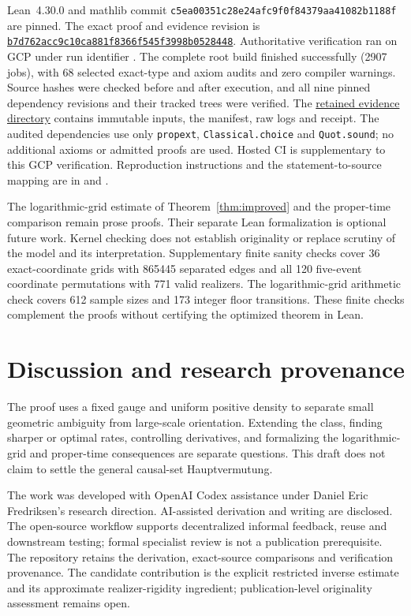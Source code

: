 \documentclass[11pt]{article}
\theoremstyle{remark}
\begin{document}
Lean~4.30.0 and mathlib commit
\texttt{c5ea00351c28e24afc9f0f84379aa41082b1188f} are pinned.
The exact proof and evidence revision is
\href{https://github.com/Quantyra/quantyra-null-cone-lean/tree/b7d762acc9c10ca881f8366f545f3998b0528448}{\texttt{b7d762acc9c10ca881f8366f545f3998b0528448}}.
Authoritative verification ran on GCP under run identifier
. The complete root build
finished successfully (2907 jobs), with 68 selected exact-type and
axiom audits and zero compiler warnings. Source hashes were checked
before and after execution, and all nine pinned dependency revisions
and their tracked trees were verified. The
\href{https://github.com/Quantyra/quantyra-null-cone-lean/tree/b7d762acc9c10ca881f8366f545f3998b0528448/evidence/gcp/space-unlabeled-20261007T123238Z-759aaa}{retained evidence directory}
contains immutable inputs, the manifest, raw logs and receipt.
The audited dependencies use only \texttt{propext},
\texttt{Classical.choice} and \texttt{Quot.sound}; no additional axioms
or admitted proofs are used. Hosted CI is supplementary to this GCP
verification. Reproduction instructions and the statement-to-source
mapping are in  and .

The logarithmic-grid estimate of Theorem~\ref{thm:improved} and the
proper-time comparison remain prose proofs. Their separate Lean
formalization is optional future work. Kernel checking does not establish
originality or replace scrutiny of the model and its interpretation.
Supplementary finite sanity checks cover 36 exact-coordinate grids
with 865445 separated edges and all 120 five-event coordinate permutations
with 771 valid realizers. The logarithmic-grid arithmetic check covers
612 sample sizes and 173 integer floor transitions. These finite checks
complement the proofs without certifying the optimized theorem in Lean.

\section{Discussion and research provenance}
The proof uses a fixed gauge and uniform positive density to separate
small geometric ambiguity from large-scale orientation. Extending
the class, finding sharper or optimal rates, controlling derivatives,
and formalizing the logarithmic-grid and proper-time consequences are
separate questions. This draft
does not claim to settle the general causal-set Hauptvermutung.

The work was developed with OpenAI Codex assistance under Daniel Eric
Fredriksen's research direction. AI-assisted derivation and writing are
disclosed. The open-source workflow supports decentralized informal
feedback, reuse and downstream testing; formal specialist review is
not a publication prerequisite. The repository retains the derivation, exact-source
comparisons and verification provenance. The candidate contribution
is the explicit restricted inverse estimate and its approximate
realizer-rigidity ingredient; publication-level originality assessment
remains open.
\end{document}
